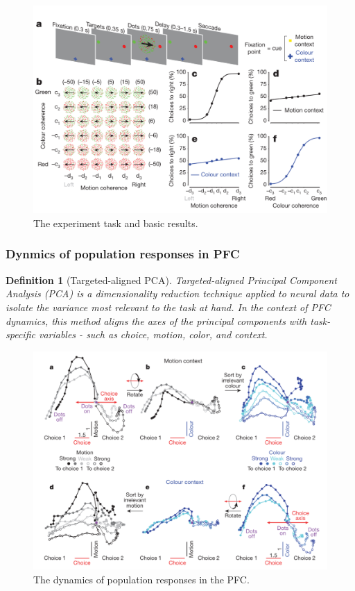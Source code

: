 \documentclass[11pt]{book} %
\newtheorem{definition}{Definition}[section]
\begin{document}
\begin{figure}[h]
    \centering
    \includegraphics[width=\textwidth]{./Figs/PFC1.jpeg}
    \caption{The experiment task and basic results.}
\end{figure}


\subsubsection{Dynmics of population responses in PFC}

\begin{definition}[Targeted-aligned PCA]
    Targeted-aligned Principal Component Analysis (PCA) is a dimensionality reduction technique applied to neural data to isolate the variance most relevant to the task at hand. 
    In the context of PFC dynamics, this method aligns the axes of the principal components with task-specific variables - such as choice, motion, color, and context. 
\end{definition}


\begin{figure}[h]
    \centering
    \includegraphics[width=\textwidth]{./Figs/PFC3.jpeg}
    \caption{The dynamics of population responses in the PFC.}
    \label{fig:PFC_PCA}
\end{figure}
\end{document}
